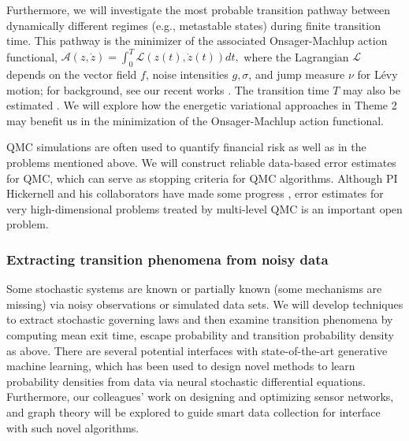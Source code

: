 \documentclass[11pt]{NSFamsart}
\begin{document}
Furthermore, we will investigate the most probable transition pathway between dynamically different regimes (e.g., metastable states) during finite transition time. This pathway is the minimizer of the associated Onsager-Machlup action functional, $\mathcal{A}(z, \dot z) = \int_0^T \mathcal{L}(z(t), \dot z(t)) dt,$ where the Lagrangian  $\mathcal{L}$ depends on the vector field $f$, noise intensities $g, \sigma$, and  jump measure $\nu$ for L\'evy motion; for background, see   our recent works \cite{ChaoDuanOM,HuangYF}. The   transition time $T$ may also be estimated \cite{HuangYF2020}. We will explore how the energetic variational approaches in Theme 2 may benefit us in the minimization of the Onsager-Machlup action functional. 

QMC simulations are often used to quantify financial risk as well as in the problems mentioned above.  We will construct reliable data-based error estimates for QMC, which can serve as stopping criteria for QMC algorithms.  Although PI Hickernell and his collaborators have made some progress \cite{HicJim16a,JimHic16a,HicEtal17a,RatHic19a,JagHic22a}, error estimates for very high-dimensional problems treated by multi-level QMC is an important open problem.

\subsubsection*{Extracting transition phenomena from noisy data}
Some   stochastic systems are known or partially known (some mechanisms are missing) via noisy observations or simulated data sets. We will  develop techniques to extract stochastic governing laws \cite{Wei2022AnOC, YangLi2020a, Li2022ExtractingGL, Lu2022LearningTT} and then examine transition phenomena by computing mean exit time, escape probability and transition probability density as above. 
There are several potential interfaces with state-of-the-art generative machine learning, which has been used to design novel methods to learn probability densities from data via neural stochastic differential equations. Furthermore, our colleagues'  work on 
designing and optimizing sensor networks, and graph theory \cite{karwa2016statistical,Calines2008MonitoringSF} will be explored to guide smart data collection for interface with such novel algorithms. 
\end{document}
